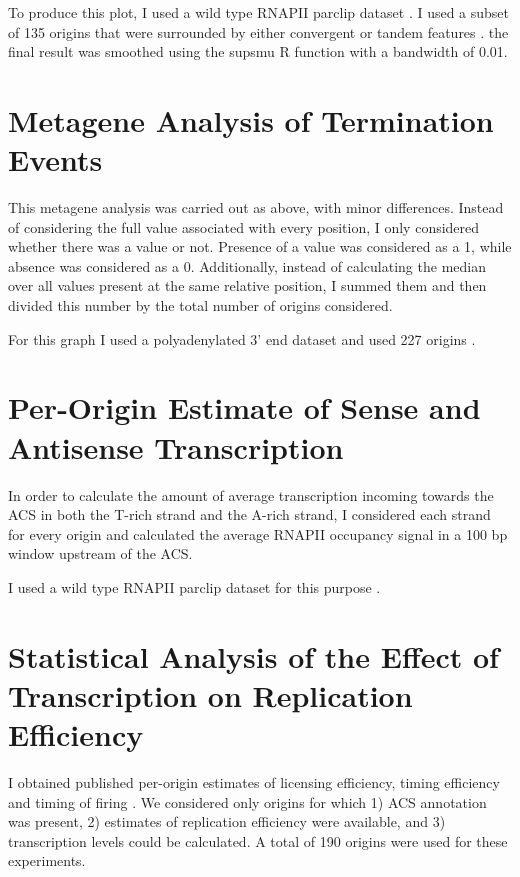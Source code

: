 To produce this plot, I used a wild type RNAPII parclip dataset \cite{schaughency:2014:genomewide}. I used a subset of 135 origins \cite{nieduszynski:2006:genomewide} that were surrounded by either convergent or tandem features \cite{xu:2009:bidirectional}. the final result was smoothed using the supsmu R function \cite{rproject} with a bandwidth of 0.01.

\section*{Metagene Analysis of Termination Events}

This metagene analysis was carried out as above, with minor differences. Instead of considering the full value associated with every position, I only considered whether there was a value or not. Presence of a value was considered as a 1, while absence was considered as a 0. Additionally, instead of calculating the median over all values present at the same relative position, I summed them and then divided this number by the total number of origins considered.

For this graph I used a polyadenylated 3’ end dataset \cite{wilkening:2013:efficient} and used 227 origins \cite{nieduszynski:2006:genomewide}.

\section*{Per-Origin Estimate of Sense and Antisense Transcription}

In order to calculate the amount of average transcription incoming towards the ACS in both the T-rich strand and the A-rich strand, I considered each strand for every origin and calculated the average RNAPII occupancy signal in a 100 bp window upstream of the ACS.

I used a wild type RNAPII parclip dataset for this purpose \cite{schaughency:2014:genomewide}.

\section*{Statistical Analysis of the Effect of Transcription on Replication Efficiency}

I obtained published per-origin estimates of licensing efficiency, timing efficiency and timing of firing \cite{hawkins:2013:highresolution}. 
We considered only origins for which 1) ACS annotation was present, 2) estimates of replication efficiency were available, and 3)  transcription levels could be calculated. 
A total of 190 origins were used for these experiments.

